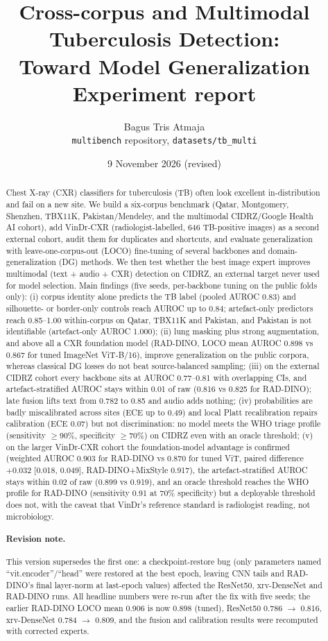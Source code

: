 \documentclass[10pt,a4paper]{article}
\title{\textbf{Cross-corpus and Multimodal Tuberculosis Detection:\\Toward Model Generalization}\\[4pt]\large Experiment report}
\author{Bagus Tris Atmaja\\\small \texttt{multibench} repository, \texttt{datasets/tb\_multi}}
\date{9 November 2026 (revised)}
\begin{document}
\maketitle
\begin{abstract}\noindent
Chest X-ray (CXR) classifiers for tuberculosis (TB) often look excellent in-distribution and fail on a new site. We build a six-corpus benchmark (Qatar, Montgomery, Shenzhen, TBX11K, Pakistan/Mendeley, and the multimodal CIDRZ/Google Health AI cohort), add VinDr-CXR (radiologist-labelled, 646 TB-positive images) as a second external cohort, audit them for duplicates and shortcuts, and evaluate generalization with leave-one-corpus-out (LOCO) fine-tuning of several backbones and domain-generalization (DG) methods. We then test whether the best image expert improves multimodal (text + audio + CXR) detection on CIDRZ, an external target never used for model selection.
Main findings (five seeds, per-backbone tuning on the public folds only): (i) corpus identity alone predicts the TB label (pooled AUROC 0.83) and silhouette- or border-only controls reach AUROC up to 0.84; artefact-only predictors reach 0.85--1.00 within-corpus on Qatar, TBX11K and Pakistan, and Pakistan is not identifiable (artefact-only AUROC 1.000); (ii) lung masking plus strong augmentation, and above all a CXR foundation model (RAD-DINO, LOCO mean AUROC 0.898 vs 0.867 for tuned ImageNet ViT-B/16), improve generalization on the public corpora, whereas classical DG losses do not beat source-balanced sampling; (iii) on the external CIDRZ cohort every backbone sits at AUROC 0.77--0.81 with overlapping CIs, and artefact-stratified AUROC stays within 0.01 of raw (0.816 vs 0.825 for RAD-DINO); late fusion lifts text from 0.782 to 0.85 and audio adds nothing; (iv) probabilities are badly miscalibrated across sites (ECE up to 0.49) and local Platt recalibration repairs calibration (ECE 0.07) but not discrimination: no model meets the WHO triage profile (sensitivity $\ge$90\%, specificity $\ge$70\%) on CIDRZ even with an oracle threshold; (v) on the larger VinDr-CXR cohort the foundation-model advantage is confirmed (weighted AUROC 0.903 for RAD-DINO vs 0.870 for tuned ViT, paired difference $+0.032$ [0.018, 0.049], RAD-DINO+MixStyle 0.917), the artefact-stratified AUROC stays within 0.02 of raw (0.899 vs 0.919), and an oracle threshold reaches the WHO profile for RAD-DINO (sensitivity 0.91 at 70\% specificity) but a deployable threshold does not, with the caveat that VinDr's reference standard is radiologist reading, not microbiology.
\paragraph{Revision note.} This version supersedes the first one: a checkpoint-restore bug (only parameters named ``vit.encoder''/``head'' were restored at the best epoch, leaving CNN tails and RAD-DINO's final layer-norm at last-epoch values) affected the ResNet50, xrv-DenseNet and RAD-DINO runs. All headline numbers were re-run after the fix with five seeds; the earlier RAD-DINO LOCO mean 0.906 is now 0.898 (tuned), ResNet50 0.786 $\rightarrow$ 0.816, xrv-DenseNet 0.784 $\rightarrow$ 0.809, and the fusion and calibration results were recomputed with corrected experts.

\end{abstract}
\end{document}
